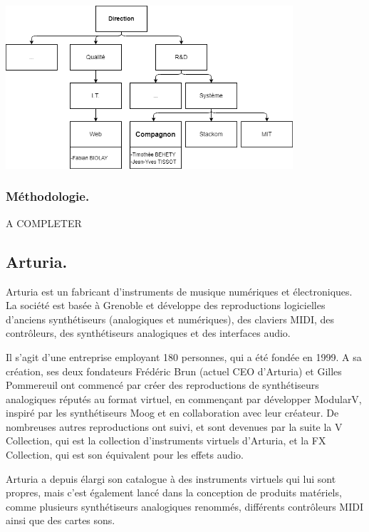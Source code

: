 \documentclass[francais]{rapportPFE}  %
\begin{document}
\begin{center}
	\centering
	\includegraphics[width=0.8\textwidth]{graphics/organigramme.png}
	\begin{tiny}
	\end{tiny}
	\label{fig}
\end{center}

\subsubsection{Méthodologie.}
A COMPLETER



\subsection{Arturia.}

Arturia est un fabricant d'instruments de musique numériques et électroniques. La société est basée à Grenoble et développe des reproductions logicielles d'anciens synthétiseurs (analogiques et numériques), des claviers MIDI, des contrôleurs, des synthétiseurs analogiques et des interfaces audio. 

Il s'agit d'une entreprise employant 180 personnes, qui a été fondée en 1999. A sa création, ses deux fondateurs Frédéric Brun (actuel CEO d'Arturia) et Gilles Pommereuil ont commencé par créer des reproductions de synthétiseurs analogiques réputés au format virtuel, en commençant par développer ModularV, inspiré par les synthétiseurs Moog et en collaboration avec leur créateur. De nombreuses autres reproductions ont suivi, et sont devenues par la suite la V Collection, qui est la collection d'instruments virtuels d'Arturia, et la FX Collection, qui est son équivalent pour les effets audio.

Arturia a depuis élargi son catalogue à des instruments virtuels qui lui sont propres, mais c'est également lancé dans la conception de produits matériels, comme plusieurs synthétiseurs analogiques renommés, différents contrôleurs MIDI ainsi que des cartes sons. 
\end{document}
